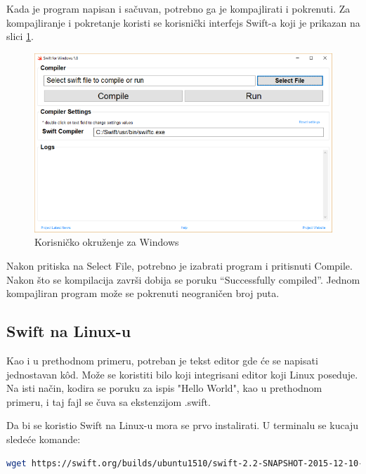 \documentclass[a4paper]{article}
\begin{document}
Kada je program napisan i sačuvan, potrebno ga je kompajlirati i pokrenuti. Za kompajliranje i pokretanje koristi se korisnički interfejs Swift-a koji je prikazan na slici \ref{fig:windows}.

\begin{figure}[h!]
\begin{center}
\includegraphics[scale=0.30]{swift-win.png}
\end{center}
\caption{Korisničko okruženje za Windows}
\label{fig:windows}
\end{figure}

Nakon pritiska na Select File, potrebno je izabrati program i pritisnuti Compile. Nakon što se kompilacija završi dobija se poruku “Successfully compiled”.
Jednom kompajliran program može se pokrenuti neograničen broj puta.

\subsection{Swift na Linux-u}
\label{subsec:podnaslovLinux}
Kao i u prethodnom primeru, potreban je tekst editor gde će se napisati jednostavan k\^{o}d.
Može se koristiti bilo koji integrisani editor koji Linux poseduje. Na isti način, kodira se poruku za ispis "Hello World", kao u prethodnom primeru, i taj fajl se čuva sa ekstenzijom .swift.

Da bi se koristio Swift na Linux-u mora se prvo instalirati. U terminalu se kucaju sledeće komande:

\begin{lstlisting}[language=bash, caption={Instaliranje Swift-a}]
	wget https://swift.org/builds/ubuntu1510/swift-2.2-SNAPSHOT-2015-12-10-a/swift-2.2-SNAPSHOT-2015-12-10-a-ubuntu15.10.tar.gz
\end{lstlisting}
\end{document}
